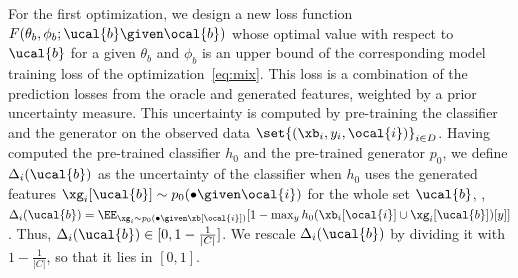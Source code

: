 \documentclass[letterpaper]{article}
\renewcommand{\cite}{\citep}
\begin{document}
 For the first optimization, we design a new loss function $F(\theta_b,\phi_b; \ucal{b} \given \ocal{b} )$ whose optimal value  with respect to $\ucal{b}$ for a given $\theta_b$ and $\phi_b$ is an upper bound of the corresponding model training loss of the optimization~\eqref{eq:mix}.  This loss is a combination of the prediction losses from the oracle and generated features, weighted by a prior uncertainty measure. This uncertainty is computed by pre-training the classifier and the generator on the observed data $\set{(\xb_i,y_i,\ocal{i})}_{i\in D}$.  Having computed the pre-trained classifier $h_0$ and the pre-trained generator $p_0$, we define
$\Delta_i(\ucal{b})$ as the uncertainty of the  
classifier when $h_0$ uses the generated features $\xg_i[\ucal{b}]\sim p_0(\bullet \given \ocal{i})$ for the whole set $\ucal{b}$, \ie,  $\Delta_i(\ucal{b}) = \EE_{\xg_i\sim p_{0}(\bullet \given \xb[\ocal{i}])} [1-\max_y h_{0}(\xb_i[\ocal{i}]\cup \xg_i[\ucal{b}])[y]]$. 
Thus, $\Delta_i(\ucal{b}) \in [0, 1-\frac{1}{|C|}]$. We rescale  $\Delta_i(\ucal{b})$ by dividing it with $1-\frac{1}{|C|}$, so that it lies in $[0,1]$.
\end{document}
